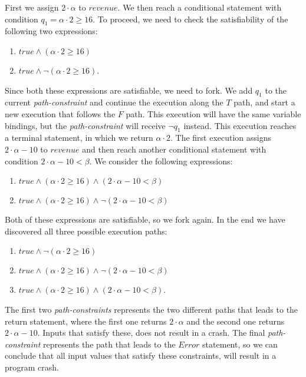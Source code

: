		First we assign $2\cdot \alpha$ to $revenue$. We then reach a conditional statement with condition $q_1 = \alpha \cdot 2 \geq 16$. To proceed, we need to check the satisfiability of the following two expressions:
		\begin{enumerate}
			\item $true \land (\alpha \cdot 2 \geq 16)$
			\item $true \land \neg (\alpha \cdot 2 \geq 16)$.
		\end{enumerate}
		Since both these expressions are satisfiable, we need to fork. We add $q_1$ to the current \emph{path-constraint} and continue the execution along the $T$ path, and start a new execution that follows the $F$ path. This execution will have the same variable bindings, but the \emph{path-constraint} will receive $\neg q_1$ instead.
		This execution reaches a terminal statement, in which we return $\alpha \cdot 2$. The first execution assigns $2\cdot \alpha - 10$ to $revenue$ and then reach another conditional statement with condition $2\cdot \alpha - 10 < \beta$. We consider the following expressions:
		\begin{enumerate}
			\item $true \land (\alpha \cdot 2 \geq 16) \land (2\cdot \alpha - 10 < \beta)$
			\item $true \land (\alpha \cdot 2 \geq 16) \land \neg (2\cdot \alpha - 10 < \beta)$
		\end{enumerate}
		Both of these expressions are satisfiable, so we fork again. In the end we have discovered all three possible execution paths:
		\begin{enumerate}
			\item $true \land \neg (\alpha \cdot 2 \geq 16)$
			\item $true \land (\alpha \cdot 2 \geq 16) \land \neg (2\cdot \alpha - 10 < \beta)$
			\item $true \land (\alpha \cdot 2 \geq 16) \land (2\cdot \alpha - 10 < \beta)$.
		\end{enumerate}
		
		The first two \emph{path-constraints} represents the two different paths that leads to the return statement, where the first one returns $2\cdot \alpha$ and the second one returns $2\cdot \alpha - 10$. Inputs that satisfy these, does not result in a crash.
		The final \emph{path-constraint} represents the path that leads to the $Error$ statement, so we can conclude that all input values that satisfy these constraints, will result in a program crash.
	
